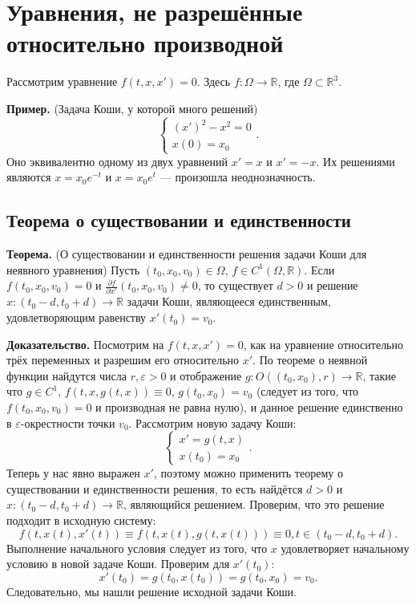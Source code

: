 \QED

\section{Уравнения, не разрешённые относительно производной}
Рассмотрим уравнение $f(t, x, x') = 0$.
Здесь $f: \Omega \to \mathbb R$, где $\Omega \subset \mathbb R^3$.

\textbf{Пример.} (Задача Коши, у которой много решений)
\[
    \begin{cases}
        (x')^2 - x^2 = 0 \\
        x(0) = x_0
    \end{cases}.
\]
Оно эквивалентно одному из двух уравнений $x' = x$ и $x' = -x$.
Их решениями являются $x = x_0 e^{-t}$ и $x = x_0 e^t$ --- произошла неоднозначность.

\subsection{Теорема о существовании и единственности}
\textbf{Теорема.} (О существовании и единственности решения задачи Коши для неявного уравнения) Пусть $(t_0, x_0, v_0) \in \Omega$, $f \in C^1(\Omega, \mathbb R)$.
Если $f(t_0, x_0, v_0) = 0$ и $\frac{\partial f}{\partial x'} (t_0, x_0, v_0) \ne 0$, то существует $d > 0$ и решение $x: (t_0 - d, t_0 + d) \to \mathbb R$ задачи Коши, являющееся единственным, удовлетворяющим равенству $x'(t_0) = v_0$.

\textbf{Доказательство.} Посмотрим на $f(t, x, x') = 0$, как на уравнение относительно трёх переменных и разрешим его относительно $x'$.
По теореме о неявной функции найдутся числа $r, \varepsilon > 0$ и отображение $g: O((t_0, x_0), r) \to \mathbb R$, такие что $g \in C^1$, $f(t, x, g(t, x)) \equiv 0$, $g(t_0, x_0) = v_0$ (следует из того, что $f(t_0, x_0, v_0) = 0$ и производная не равна нулю), и данное решение единственно в $\varepsilon$-окрестности точки $v_0$.
Рассмотрим новую задачу Коши:
\[
    \begin{cases}
        x' = g(t, x) \\
        x(t_0) = x_0
    \end{cases}.
\]
Теперь у нас явно выражен $x'$, поэтому можно применить теорему о существовании и единственности решения, то есть найдётся $d > 0$ и $x: (t_0 - d, t_0 + d) \to \mathbb R$, являющийся решением.
Проверим, что это решение подходит в исходную систему:
\[
    f(t, x(t), x'(t)) \equiv f(t, x(t), g(t, x(t))) \equiv 0, t \in (t_0 - d, t_0 + d).
\]
Выполнение начального условия следует из того, что $x$ удовлетворяет начальному условию в новой задаче Коши.
Проверим для $x'(t_0)$:
\[
    x'(t_0) = g(t_0, x(t_0)) = g(t_0, x_0) = v_0.
\]
Следовательно, мы нашли решение исходной задачи Коши. 

